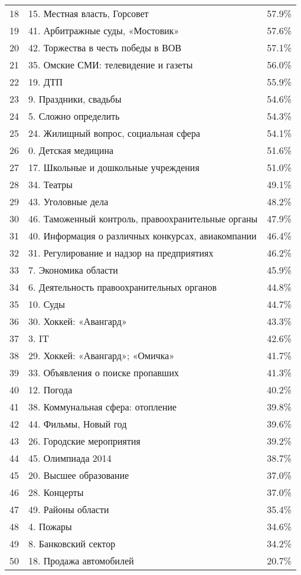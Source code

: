 \begin{longtable}[c]{| L{3cm} | C{7cm} | R{5cm} |}
		18 & 15. Местная власть, Горсовет & 57.9\% \\
		19 & 41. Арбитражные суды, «Мостовик» & 57.6\% \\
		20 & 42. Торжества в честь победы в ВОВ & 57.1\% \\
		21 & 35. Омские СМИ: телевидение и газеты & 56.0\% \\
		22 & 19. ДТП & 55.9\% \\
		23 & 9. Праздники, свадьбы & 54.6\% \\
		24 & 5. Сложно определить & 54.3\% \\
		25 & 24. Жилищный вопрос, социальная сфера & 54.1\% \\
		26 & 0. Детская медицина & 51.6\% \\
		27 & 17. Школьные и дошкольные учреждения & 51.0\% \\
		28 & 34. Театры & 49.1\% \\
		29 & 43. Уголовные дела & 48.2\% \\
		30 & 46. Таможенный контроль, правоохранительные органы & 47.9\% \\
		31 & 40. Информация о различных конкурсах, авиакомпании & 46.4\% \\
		32 & 31. Регулирование и надзор на предприятиях & 46.2\% \\
		33 & 7. Экономика области & 45.9\% \\
		34 & 6. Деятельность правоохранительных органов & 44.8\% \\
		35 & 10. Суды & 44.7\% \\
		36 & 30. Хоккей: «Авангард» & 43.3\% \\
		37 & 3. IT & 42.6\% \\
		38 & 29. Хоккей: «Авангард»; «Омичка» & 41.7\% \\
		39 & 33. Объявления о поиске пропавших & 41.3\% \\
		40 & 12. Погода & 40.2\% \\
		41 & 38. Коммунальная сфера: отопление & 39.8\% \\
		42 & 44. Фильмы, Новый год & 39.6\% \\
		43 & 26. Городские мероприятия & 39.2\% \\
		44 & 45. Олимпиада 2014 & 38.7\% \\
		45 & 20. Высшее образование & 37.0\% \\
		46 & 28. Концерты & 37.0\% \\
		47 & 49. Районы области & 35.4\% \\
		48 & 4. Пожары & 34.6\% \\
		49 & 8. Банковский сектор & 34.2\% \\
		50 & 18. Продажа автомобилей & 20.7\% \\
	\hline
\end{longtable}


